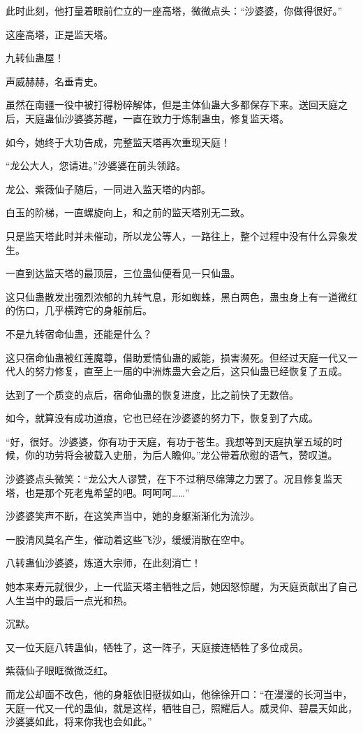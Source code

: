 \begin{this_body}
此时此刻，他打量着眼前伫立的一座高塔，微微点头：“沙婆婆，你做得很好。”

这座高塔，正是监天塔。

九转仙蛊屋！

声威赫赫，名垂青史。

虽然在南疆一役中被打得粉碎解体，但是主体仙蛊大多都保存下来。送回天庭之后，天庭蛊仙沙婆婆苏醒，一直在致力于炼制蛊虫，修复监天塔。

如今，她终于大功告成，完整监天塔再次重现天庭！

“龙公大人，您请进。”沙婆婆在前头领路。

龙公、紫薇仙子随后，一同进入监天塔的内部。

白玉的阶梯，一直螺旋向上，和之前的监天塔别无二致。

只是监天塔此时并未催动，所以龙公等人，一路往上，整个过程中没有什么异象发生。

一直到达监天塔的最顶层，三位蛊仙便看见一只仙蛊。

这只仙蛊散发出强烈浓郁的九转气息，形如蜘蛛，黑白两色，蛊虫身上有一道微红的伤口，几乎横跨它的身躯前后。

不是九转宿命仙蛊，还能是什么？

这只宿命仙蛊被红莲魔尊，借助爱情仙蛊的威能，损害濒死。但经过天庭一代又一代人的努力修复，直至上一届的中洲炼蛊大会之后，这只仙蛊已经恢复了五成。

达到了一个质变的点后，宿命仙蛊的恢复进度，比之前快了无数倍。

如今，就算没有成功道痕，它也已经在沙婆婆的努力下，恢复到了六成。

“好，很好。沙婆婆，你有功于天庭，有功于苍生。我想等到天庭执掌五域的时候，你的功劳将会被载入史册，为后人瞻仰。”龙公带着欣慰的语气，赞叹道。

沙婆婆点头微笑：“龙公大人谬赞，在下不过稍尽绵薄之力罢了。况且修复监天塔，也是那个死老鬼希望的吧。呵呵呵……”

沙婆婆笑声不断，在这笑声当中，她的身躯渐渐化为流沙。

一股清风莫名产生，催动着这些飞沙，缓缓消散在空中。

八转蛊仙沙婆婆，炼道大宗师，在此刻消亡！

她本来寿元就很少，上一代监天塔主牺牲之后，她因怒惊醒，为天庭贡献出了自己人生当中的最后一点光和热。

沉默。

又一位天庭八转蛊仙，牺牲了，这一阵子，天庭接连牺牲了多位成员。

紫薇仙子眼眶微微泛红。

而龙公却面不改色，他的身躯依旧挺拔如山，他徐徐开口：“在漫漫的长河当中，天庭一代又一代的蛊仙，就是这样，牺牲自己，照耀后人。威灵仰、碧晨天如此，沙婆婆如此，将来你我也会如此。”


\end{this_body}
